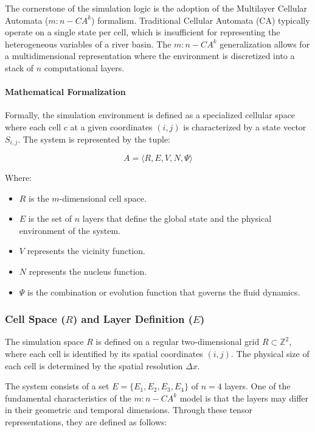 The cornerstone of the simulation logic is the adoption of the Multilayer Cellular Automata ($m:n-CA^k$) formalism. Traditional 
Cellular Automata (CA) typically operate on a single state per cell, which is insufficient for representing the heterogeneous variables 
of a river basin. The $m:n-CA^k$ generalization allows for a multidimensional representation where the environment is discretized into 
a stack of $n$ computational layers.

\paragraph{Mathematical Formalization}

Formally, the simulation environment is defined as a specialized cellular space where each cell $c$ at a given coordinates $(i, j)$ is 
characterized by a state vector $S_{i,j}$. The system is represented by the tuple:

$$A = \langle R, E, V, N, \Psi \rangle$$

Where:

\begin{itemize}
    \item $R$ is the $m$-dimensional cell space.
    \item $E$ is the set of $n$ layers that define the global state and the physical environment of the system.
    \item $V$ represents the vicinity function.
    \item $N$ represents the nucleus function.
    \item $\Psi$ is the combination or evolution function that governs the fluid dynamics.
\end{itemize}


\subsubsection{Cell Space ($R$) and Layer Definition ($E$)}

The simulation space $R$ is defined on a regular two-dimensional grid $R \subset \mathbb{Z}^2$, where each cell is 
identified by its spatial coordinates $(i, j)$. The physical size of each cell is determined by the spatial resolution 
$\Delta x$.

The system consists of a set $E = \{E_1, E_2, E_3, E_4\}$ of $n=4$ layers. One of the fundamental characteristics of the 
$m:n-CA^k$ model is that the layers may differ in their geometric and temporal dimensions. Through these tensor representations, 
they are defined as follows:

